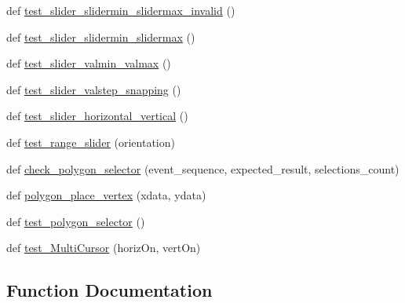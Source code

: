 \begin{DoxyCompactItemize}
\item 
def \hyperlink{namespacematplotlib_1_1tests_1_1test__widgets_a07a370b4fdca6156b81dd9e1d7946516}{test\+\_\+slider\+\_\+slidermin\+\_\+slidermax\+\_\+invalid} ()
\item 
def \hyperlink{namespacematplotlib_1_1tests_1_1test__widgets_a3a0916404dcc5dc235b839f8346caaa9}{test\+\_\+slider\+\_\+slidermin\+\_\+slidermax} ()
\item 
def \hyperlink{namespacematplotlib_1_1tests_1_1test__widgets_af664937f035859bda17c4ebe09d3f99b}{test\+\_\+slider\+\_\+valmin\+\_\+valmax} ()
\item 
def \hyperlink{namespacematplotlib_1_1tests_1_1test__widgets_a05c162f3e084149def00bf22637e6d52}{test\+\_\+slider\+\_\+valstep\+\_\+snapping} ()
\item 
def \hyperlink{namespacematplotlib_1_1tests_1_1test__widgets_aeec5944d8e6fdf291e89a71a87443f1e}{test\+\_\+slider\+\_\+horizontal\+\_\+vertical} ()
\item 
def \hyperlink{namespacematplotlib_1_1tests_1_1test__widgets_a1d375aff73e04c66ae1c6fb38dd1db48}{test\+\_\+range\+\_\+slider} (orientation)
\item 
def \hyperlink{namespacematplotlib_1_1tests_1_1test__widgets_ab807365eb5a45add7a05b60b7a8765dc}{check\+\_\+polygon\+\_\+selector} (event\+\_\+sequence, expected\+\_\+result, selections\+\_\+count)
\item 
def \hyperlink{namespacematplotlib_1_1tests_1_1test__widgets_a9381fe6bd10bcf5a68e98e771a86bcb0}{polygon\+\_\+place\+\_\+vertex} (xdata, ydata)
\item 
def \hyperlink{namespacematplotlib_1_1tests_1_1test__widgets_a862fee480e5f793a6ce2aee4c6730881}{test\+\_\+polygon\+\_\+selector} ()
\item 
def \hyperlink{namespacematplotlib_1_1tests_1_1test__widgets_a745cf379f70a7d65a7d3ace7933845a5}{test\+\_\+\+Multi\+Cursor} (horiz\+On, vert\+On)
\end{DoxyCompactItemize}


\subsection{Function Documentation}
\mbox{\label{namespacematplotlib_1_1tests_1_1test__widgets_a972878469ae48ece4185b2305cb58ded}} 
